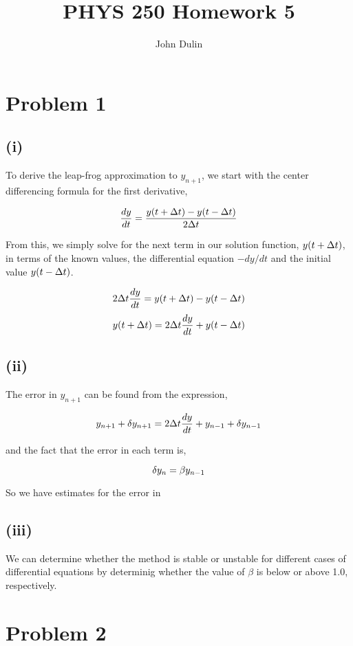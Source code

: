 \documentclass{article}
\author{John Dulin}
\title{PHYS 250 Homework 5}
\begin{document}
\maketitle

\section*{Problem 1}

\subsection*{(i)}
To derive the leap-frog approximation to $y_{n+1}$, we start with the center differencing formula for the first derivative,

$$ \frac{dy}{dt} = \frac{y(t + \Delta\/t) - y(t - \Delta\/t)}{2\Delta\/t} $$

From this, we simply solve for the next term in our solution function, $y(t + \Delta\/t)$, in terms of the 
known values, the differential equation $-dy/dt$ and the initial value $y(t - \Delta\/t)$.

$$ 2\Delta\/t\frac{dy}{dt} = y(t + \Delta\/t) - y(t - \Delta\/t)   $$
$$ y(t + \Delta\/t) = 2\Delta\/t\frac{dy}{dt} + y(t - \Delta\/t) $$ 

\subsection*{(ii)}

The error in $y_{n+1}$ can be found from the expression,

$$ y_{n+1} + \delta\/y_{n+1} = 2\Delta\/t\frac{dy}{dt} + y_{n-1}+  \delta\/y_{n-1} $$

and the fact that the error in each term is,

$$ \delta\/y_{n} = \beta\/y_{n-1} $$

So we have estimates for the error in 

\subsection*{(iii)}
We can determine whether the method is stable or unstable for different cases of differential equations by determinig whether the value of $\beta$ is below or above 1.0, respectively.

\section*{Problem 2}
\end{document}
